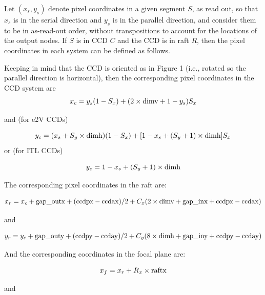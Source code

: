 \documentclass{article}[12pt]
\newcommand{\red}{\textcolor{red}}
\begin{document}
{%

Let $(x_s, y_s)$ denote pixel coordinates in a given segment $S$, as read out, so that $x_s$ is in the serial direction and $y_s$ is in the parallel direction, and consider them to be in as-read-out order, without transpositions to account for the locations of the output nodes.  If $S$ is in CCD $C$ and the CCD is in raft $R$, then the pixel coordinates in each system can be defined as follows.

Keeping in mind that the CCD is oriented as in Figure 1 (i.e., rotated so the parallel direction is horizontal), then the corresponding pixel coordinates in the CCD system are 
\begin{equation}
x_c = y_s (1 - S_x) + (2 \times {\rm dimv} + 1 - y_s)  S_x
\end{equation}

and (for e2V CCDs)

\begin{equation}
y_c = (x_s + S_y \times {\rm dimh})  (1 - S_x) + [1 - x_s + (S_y + 1) \times {\rm dimh}] S_x
\end {equation}
or (for ITL CCDs)

\begin{equation}
y_c = 1 - x_s + (S_y  + 1) \times {\rm dimh} 
\end{equation}

The corresponding pixel coordinates in the raft are:

\begin{equation}
x_r = x_c + {\rm gap\_outx} + ({\rm ccdpx} - {\rm ccdax})/2 + C_x ( 2 \times {\rm dimv} + {\rm gap\_inx} + {\rm ccdpx} - {\rm ccdax})
\end{equation}

and

\begin{equation}
y_r = y_c + {\rm gap\_outy} + ({\rm ccdpy} - {\rm ccday})/2 + C_y ( 8 \times {\rm dimh} + {\rm gap\_iny} + {\rm ccdpy} - {\rm ccday})
\end{equation}

And the corresponding coordinates in the focal plane are:

\begin{equation}
x_f = x_r + R_x \times {\rm raftx}
\end{equation}

and

}
\end{document}
